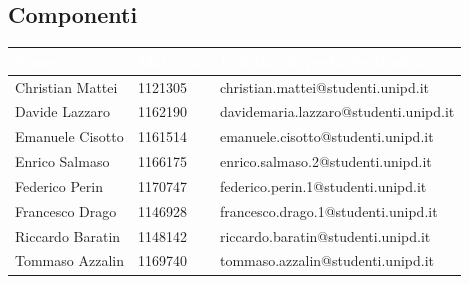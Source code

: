 \clearpage
\subsection{Componenti}
{
	\renewcommand{\arraystretch}{2}
	\begin{longtable}{ C{4cm} C{2cm} C{8cm} }
		\textcolor{white}{\textbf{Nome}} & \textcolor{white}{\textbf{Matricola}} & \textcolor{white}{\textbf{Indirizzo di posta elettronica}}\\\endhead	
		
		Christian Mattei & 1121305 & christian.mattei@studenti.unipd.it \\
		Davide Lazzaro & 1162190 & davidemaria.lazzaro@studenti.unipd.it\\
		Emanuele Cisotto & 1161514 & emanuele.cisotto@studenti.unipd.it\\
		Enrico Salmaso & 1166175 & enrico.salmaso.2@studenti.unipd.it \\
		Federico Perin & 1170747 & federico.perin.1@studenti.unipd.it \\
		Francesco Drago & 1146928 & francesco.drago.1@studenti.unipd.it \\
		Riccardo Baratin & 1148142 & riccardo.baratin@studenti.unipd.it \\
		Tommaso Azzalin & 1169740 & tommaso.azzalin@studenti.unipd.it \\
		
		
	\end{longtable}
}